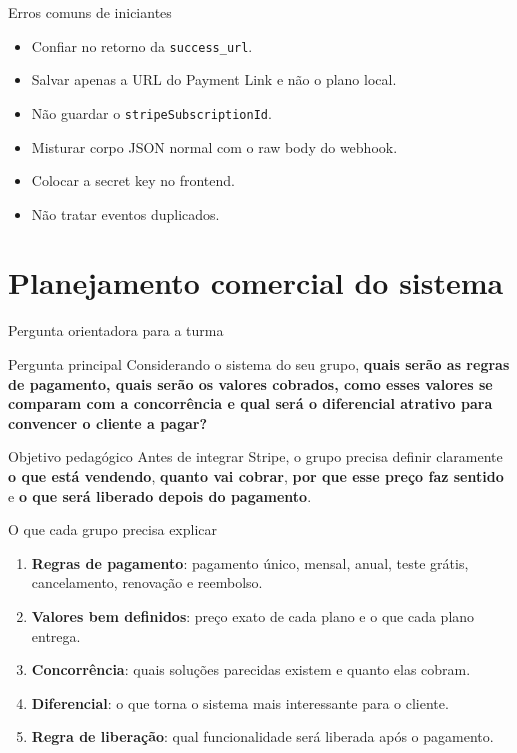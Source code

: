 \documentclass[aspectratio=169]{beamer}
\newcommand{\code}[1]{\texttt{#1}}
\begin{document}
\begin{frame}{Erros comuns de iniciantes}
\begin{itemize}
  \item Confiar no retorno da \code{success\_url}.
  \item Salvar apenas a URL do Payment Link e não o plano local.
  \item Não guardar o \code{stripeSubscriptionId}.
  \item Misturar corpo JSON normal com o raw body do webhook.
  \item Colocar a secret key no frontend.
  \item Não tratar eventos duplicados.
\end{itemize}
\end{frame}

\section{Planejamento comercial do sistema}

\begin{frame}{Pergunta orientadora para a turma}
\begin{block}{Pergunta principal}
Considerando o sistema do seu grupo, \textbf{quais serão as regras de pagamento, quais serão os valores cobrados, como esses valores se comparam com a concorrência e qual será o diferencial atrativo para convencer o cliente a pagar?}
\end{block}

\begin{alertblock}{Objetivo pedagógico}
Antes de integrar Stripe, o grupo precisa definir claramente \textbf{o que está vendendo}, \textbf{quanto vai cobrar}, \textbf{por que esse preço faz sentido} e \textbf{o que será liberado depois do pagamento}.
\end{alertblock}
\end{frame}

\begin{frame}{O que cada grupo precisa explicar}
\begin{enumerate}
  \item \textbf{Regras de pagamento}: pagamento único, mensal, anual, teste grátis, cancelamento, renovação e reembolso.
  \item \textbf{Valores bem definidos}: preço exato de cada plano e o que cada plano entrega.
  \item \textbf{Concorrência}: quais soluções parecidas existem e quanto elas cobram.
  \item \textbf{Diferencial}: o que torna o sistema mais interessante para o cliente.
  \item \textbf{Regra de liberação}: qual funcionalidade será liberada após o pagamento.
\end{enumerate}
\end{frame}
\end{document}

